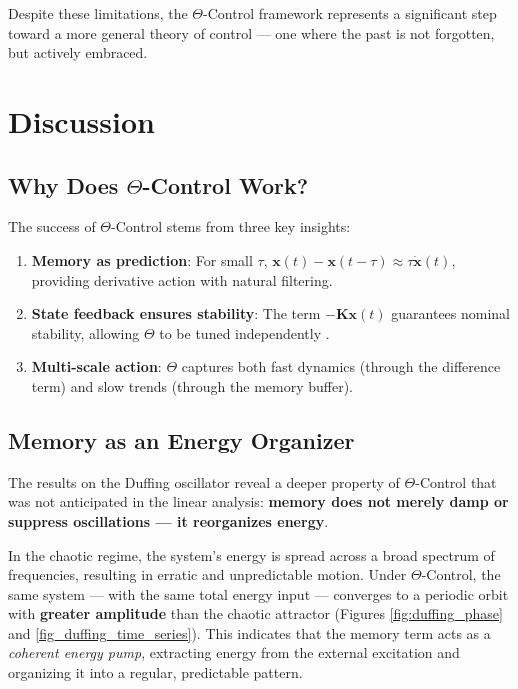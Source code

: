 \documentclass[12pt,a4paper]{article}
\begin{document}
Despite these limitations, the $\Theta$-Control framework 
represents a significant step toward a more general theory of 
control — one where the past is not forgotten, but actively 
embraced.

\section{Discussion}

\subsection{Why Does $\Theta$-Control Work?}

The success of $\Theta$-Control stems from three key insights:

\begin{enumerate}
    \item \textbf{Memory as prediction}: For small $\tau$, 
    $\mathbf{x}(t)-\mathbf{x}(t-\tau) \approx \tau\dot{\mathbf{x}}(t)$, 
    providing derivative action with natural filtering.
    
    \item \textbf{State feedback ensures stability}: The term 
    $-\mathbf{K}\mathbf{x}(t)$ guarantees nominal stability, allowing 
    $\Theta$ to be tuned independently \citep{Fridman2014}.
    
    \item \textbf{Multi-scale action}: $\Theta$ captures both fast 
    dynamics (through the difference term) and slow trends (through 
    the memory buffer).
\end{enumerate}

\subsection{Memory as an Energy Organizer}

The results on the Duffing oscillator reveal a deeper property of 
$\Theta$-Control that was not anticipated in the linear analysis: 
\textbf{memory does not merely damp or suppress oscillations — it 
reorganizes energy}. 

In the chaotic regime, the system's energy is spread across a broad 
spectrum of frequencies, resulting in erratic and unpredictable 
motion. Under $\Theta$-Control, the same system — with the same 
total energy input — converges to a periodic orbit with 
\textbf{greater amplitude} than the chaotic attractor (Figures 
\ref{fig:duffing_phase} and \ref{fig_duffing_time_series}). This 
indicates that the memory term acts as a \emph{coherent energy 
pump}, extracting energy from the external excitation and 
organizing it into a regular, predictable pattern.
\end{document}
